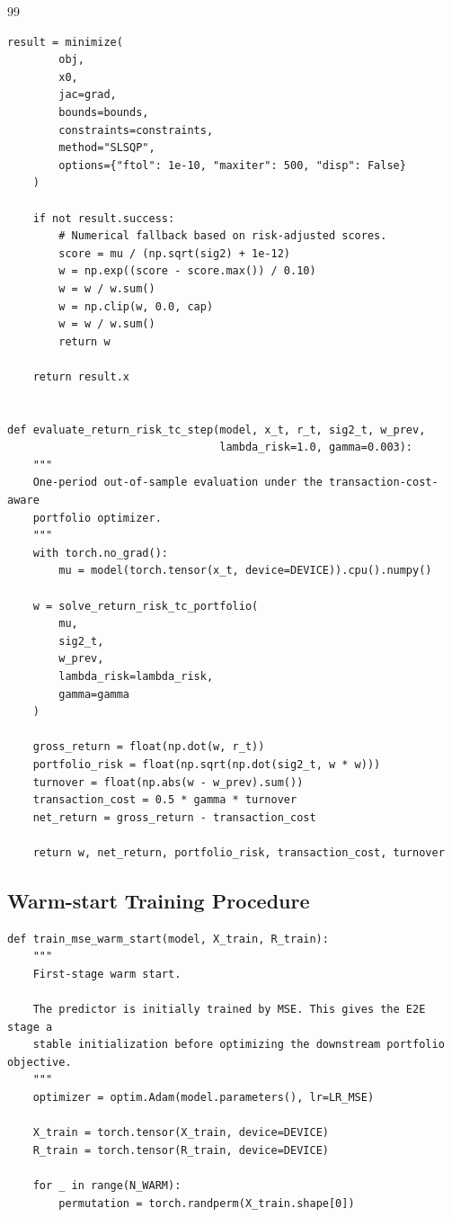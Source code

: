 \documentclass[11pt]{article}
\begin{document}
\begin{thebibliography}{99}
\begin{lstlisting}[style=appendixpython,caption={Core implementation of the return-plus-risk-plus-transaction-cost objective}]
    result = minimize(
        obj,
        x0,
        jac=grad,
        bounds=bounds,
        constraints=constraints,
        method="SLSQP",
        options={"ftol": 1e-10, "maxiter": 500, "disp": False}
    )

    if not result.success:
        # Numerical fallback based on risk-adjusted scores.
        score = mu / (np.sqrt(sig2) + 1e-12)
        w = np.exp((score - score.max()) / 0.10)
        w = w / w.sum()
        w = np.clip(w, 0.0, cap)
        w = w / w.sum()
        return w

    return result.x


def evaluate_return_risk_tc_step(model, x_t, r_t, sig2_t, w_prev,
                                 lambda_risk=1.0, gamma=0.003):
    """
    One-period out-of-sample evaluation under the transaction-cost-aware
    portfolio optimizer.
    """
    with torch.no_grad():
        mu = model(torch.tensor(x_t, device=DEVICE)).cpu().numpy()

    w = solve_return_risk_tc_portfolio(
        mu,
        sig2_t,
        w_prev,
        lambda_risk=lambda_risk,
        gamma=gamma
    )

    gross_return = float(np.dot(w, r_t))
    portfolio_risk = float(np.sqrt(np.dot(sig2_t, w * w)))
    turnover = float(np.abs(w - w_prev).sum())
    transaction_cost = 0.5 * gamma * turnover
    net_return = gross_return - transaction_cost

    return w, net_return, portfolio_risk, transaction_cost, turnover
\end{lstlisting}

\subsection{Warm-start Training Procedure}

\begin{lstlisting}[style=appendixpython,caption={Warm-start training and E2E fine-tuning procedure}]
def train_mse_warm_start(model, X_train, R_train):
    """
    First-stage warm start.

    The predictor is initially trained by MSE. This gives the E2E stage a
    stable initialization before optimizing the downstream portfolio objective.
    """
    optimizer = optim.Adam(model.parameters(), lr=LR_MSE)

    X_train = torch.tensor(X_train, device=DEVICE)
    R_train = torch.tensor(R_train, device=DEVICE)

    for _ in range(N_WARM):
        permutation = torch.randperm(X_train.shape[0])


\end{lstlisting}
\end{thebibliography}
\end{document}
